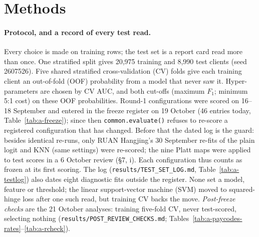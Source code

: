 \section{Methods}

\paragraph{Protocol, and a record of every test read.}
Every choice is made on training rows; the test set is a report card read more than once. One stratified split gives 20,975 training and 8,990 test clients (seed 2607526). Five shared stratified cross-validation (CV) folds give each training client an out-of-fold (OOF) probability from a model that never saw it. Hyper-parameters are chosen by CV AUC, and both cut-offs (maximum $F_1$; minimum 5:1 cost) on these OOF probabilities. Round-1 configurations were scored on 16--18 September and entered in the freeze register on 19 October (46 entries today, Table~\ref{tab:a-freeze}); since then \texttt{common.evaluate()} refuses to re-score a registered configuration that has changed. Before that the dated log is the guard: besides identical re-runs, only RUAN Hangjing's 30 September re-fits of the plain logit and KNN (same settings) were re-scored; the nine Platt maps were applied to test scores in a 6 October review (\S7, i). Each configuration thus counts as frozen at its first scoring. The log (\texttt{results/TEST\_SET\_LOG.md}, Table~\ref{tab:a-testlog}) also dates eight diagnostic fits outside the register. None set a model, feature or threshold; the linear support-vector machine (SVM) moved to squared-hinge loss after one such read, but training CV backs the move. \emph{Post-freeze checks} are the 21 October analyses: training five-fold CV, never test-scored, selecting nothing (\texttt{results/POST\_REVIEW\_CHECKS.md}; Tables~\ref{tab:a-paycodes-rates}--\ref{tab:a-rcheck}).

